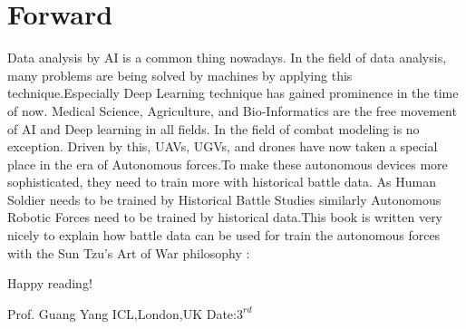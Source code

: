 \documentclass[]{article}
\begin{document}
\normalsize
{}
\justifying{}
\section*{Forward}
Data analysis by AI is a common thing nowadays. In the field of data analysis, many problems are being solved by machines by applying this technique.Especially Deep Learning technique has gained prominence in the time of now. Medical Science, Agriculture, and Bio-Informatics are the free movement of AI and Deep learning in all fields. In the field of combat modeling is no exception. Driven by this, UAVs, UGVs, and drones have now taken a special place in the era of Autonomous forces.To make these autonomous devices more sophisticated, they need to train more with historical battle data. As Human Soldier needs to be trained by Historical Battle Studies similarly Autonomous Robotic Forces need to be trained by historical data.This book is written very nicely to explain how battle data can be used for train the autonomous forces with the Sun Tzu's Art of War philosophy :\newline


Happy reading!\newline



\RaggedLeft    
Prof. Guang Yang\newline
ICL,London,UK\newline
Date:$3^{rd}$ 
\newpage 

\normalsize
\end{document}
